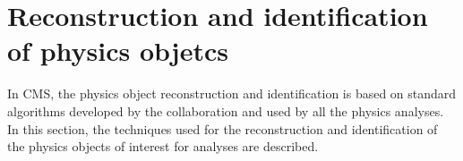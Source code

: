 \chapter{Reconstruction and identification of physics objetcs}\label{chap3}
\thispagestyle{empty}

In CMS, the physics object reconstruction and identification is based on standard algorithms developed by the collaboration and used by all the physics analyses. In this section, the techniques used for the reconstruction and identification of the physics objects of interest for \hwwllnn analyses are described.






